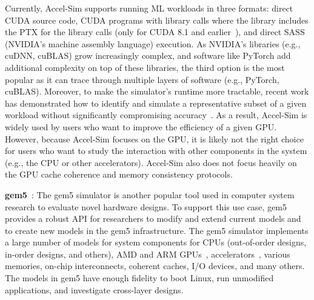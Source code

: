 Currently, Accel-Sim supports running ML workloads in three formats: direct CUDA source code, CUDA programs with library calls where the library includes the PTX for the library calls (only for CUDA 8.1 and earlier~\cite{LewShah2018-gpgpusimML}), and direct SASS (NVIDIA's machine assembly language) execution.
As NVIDIA's libraries (e.g., cuDNN, cuBLAS) grow increasingly complex, and software like PyTorch add additional complexity on top of these libraries, the third option is the most popular as it can trace through multiple layers of software (e.g., PyTorch, cuBLAS).
Moreover, to make the simulator's runtime more tractable, recent work has demonstrated how to identify and simulate a representative subset of a given workload without significantly compromising accuracy~\cite{AvalosKhairy2021-pka}.
As a result, Accel-Sim is widely used by users who want to improve the efficiency of a given GPU.
However, because Accel-Sim focuses on the GPU, it is likely not the right choice for users who want to study the interaction with other components in the system (e.g., the CPU or other accelerators).
Accel-Sim also does not focus heavily on the GPU cache coherence and memory consistency protocols.

\noindent
\textbf{gem5}~\cite{binkert2011gem5, LowePowerAhmad2020-gem520}: %
The gem5 simulator is another popular tool used in computer system research to evaluate novel hardware designs. 
To support this use case, gem5 provides a robust API for researchers to modify and extend current models and to create new models in the gem5 infrastructure.
The gem5 simulator implements a large number of models for system components for CPUs (out-of-order designs, in-order designs, and others), AMD and ARM GPUs~\cite{GutierrezBeckmann2018-gem5GPU}, accelerators~\cite{RogersSlycord2020-gem5Salam, SpencerRogers2024-gem5Salam2, ChaudhariSinclair2025-gem5Accel}, various memories, on-chip interconnects, coherent caches, I/O devices, and many others.
The models in gem5 have enough fidelity to boot Linux, run unmodified applications, and investigate cross-layer designs.

